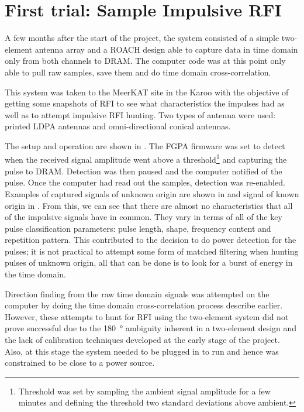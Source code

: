 \section{First trial: Sample Impulsive RFI}

A few months after the start of the project, the system consisted of a simple two-element antenna array and a ROACH design able to capture data in time domain only from both channels to DRAM. The computer code was at this point only able to pull raw samples, save them and do time domain cross-correlation. 

This system was taken to the MeerKAT site in the Karoo with the objective of getting some snapshots of RFI to see what characteristics the impulses had as well as to attempt impulsive RFI hunting. Two types of antenna were used: printed LDPA antennas and omni-directional conical antennas.

The setup and operation are shown in . The FGPA firmware was set to detect when the received signal amplitude went above a threshold\footnote{Threshold was set by sampling the ambient signal amplitude for a few minutes and defining the threshold two standard deviations above ambient.} and capturing the pulse to DRAM. Detection was then paused and the computer notified of the pulse. Once the computer had read out the samples, detection was re-enabled. Examples of captured signals of unknown origin are shown in  and signal of known origin in . From this, we can see that there are almost no characteristics that all of the impulsive signals have in common. They vary in terms of all of the key pulse classification parameters: pulse length, shape, frequency content and repetition pattern. This contributed to the decision to do power detection for the pulses; it is not practical to attempt some form of matched filtering when hunting pulses of unknown origin, all that can be done is to look for a burst of energy in the time domain.

Direction finding from the raw time domain signals was attempted on the computer by doing the time domain cross-correlation process describe earlier. However, these attempts to hunt for RFI using the two-element system did not prove successful due to the \SI{180}{\degree} ambiguity inherent in a two-element design and the lack of calibration techniques developed at the early stage of the project. Also, at this stage the system needed to be plugged in to run and hence was constrained to be close to a power source.

